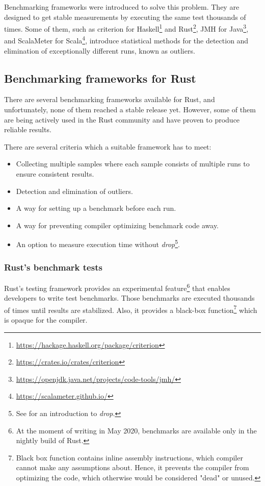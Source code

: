 Benchmarking frameworks were introduced to solve this problem. They are designed to get stable measurements by executing the same test thousands of times. Some of them, such as criterion for Haskell\footnote{\url{https://hackage.haskell.org/package/criterion}} and Rust\footnote{\url{https://crates.io/crates/criterion}}, JMH for Java\footnote{\url{https://openjdk.java.net/projects/code-tools/jmh/}}, and ScalaMeter for Scala\footnote{\url{https://scalameter.github.io/}}, introduce statistical methods for the detection and elimination of exceptionally different runs, known as outliers.

\subsection{Benchmarking frameworks for Rust}
There are several benchmarking frameworks available for Rust, and unfortunately, none of them reached a stable release yet. However, some of them are being actively used in the Rust community and have proven to produce reliable results.

There are several criteria which a suitable framework has to meet:
\begin{itemize}
    \item Collecting multiple samples where each sample consists of multiple runs to ensure consistent results.
    \item Detection and elimination of outliers.
    \item A way for setting up a benchmark before each run.
    \item A way for preventing compiler optimizing benchmark code away.
    \item An option to measure execution time without \emph{drop}\footnote{See  for an introduction to \emph{drop}.}.
\end{itemize}

\subsubsection*{Rust's benchmark tests}
Rust's testing framework provides an experimental feature\footnote{At the moment of writing in May 2020, benchmarks are available only in the nightly build of Rust.} that enables developers to write test benchmarks. Those benchmarks are executed thousands of times until results are stabilized. Also, it provides a black-box function\footnote{Black box function contains inline assembly instructions, which compiler cannot make any assumptions about. Hence, it prevents the compiler from optimizing the code, which otherwise would be considered "dead" or unused.} which is opaque for the compiler.

